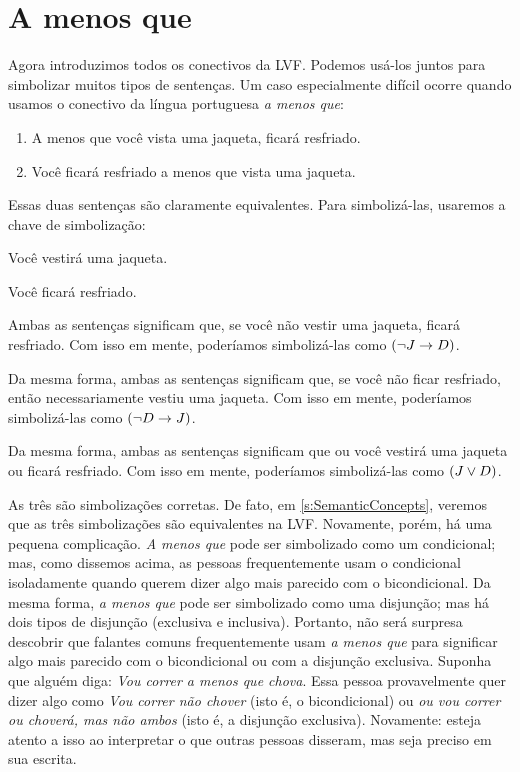 \section{A menos que}
Agora introduzimos todos os conectivos da LVF. Podemos usá-los juntos
para simbolizar muitos tipos de sentenças. Um caso especialmente difícil
ocorre quando usamos o conectivo da língua portuguesa \emph{a menos que}:

\begin{enumerate}
\item\label{unless1}A menos que você vista uma jaqueta, ficará resfriado.
\item\label{unless2}Você ficará resfriado a menos que vista uma jaqueta.
\end{enumerate}
Essas duas sentenças são claramente equivalentes. Para simbolizá-las,
usaremos a chave de simbolização:
	\begin{ekey}
		\item[J] Você vestirá uma jaqueta.
		\item[D] Você ficará resfriado.
	\end{ekey}
Ambas as sentenças significam que, se você não vestir uma jaqueta, ficará
resfriado. Com isso em mente, poderíamos simbolizá-las como
$(\neg J \rightarrow D)$.

Da mesma forma, ambas as sentenças significam que, se você não ficar
resfriado, então necessariamente vestiu uma jaqueta. Com isso em mente,
poderíamos simbolizá-las como $(\neg D \rightarrow J)$.

Da mesma forma, ambas as sentenças significam que ou você vestirá uma
jaqueta ou ficará resfriado. Com isso em mente, poderíamos simbolizá-las
como $(J \vee D)$.

As três são simbolizações corretas. De fato, em
\cref{s:SemanticConcepts}, veremos que as três simbolizações são
equivalentes na LVF.
Novamente, porém, há uma pequena complicação. \emph{A menos que} pode
ser simbolizado como um condicional; mas, como dissemos acima, as pessoas
frequentemente usam o condicional isoladamente quando querem dizer algo
mais parecido com o bicondicional. Da mesma forma, \emph{a menos que}
pode ser simbolizado como uma disjunção; mas há dois tipos de disjunção
(exclusiva e inclusiva). Portanto, não será surpresa descobrir que
falantes comuns frequentemente usam \emph{a menos que} para significar
algo mais parecido com o bicondicional ou com a disjunção exclusiva.
Suponha que alguém diga: \emph{Vou correr a menos que chova}. Essa pessoa
provavelmente quer dizer algo como \emph{Vou correr \ifeff{} não chover}
(isto é, o bicondicional) ou \emph{ou vou correr ou choverá, mas não
ambos} (isto é, a disjunção exclusiva). Novamente: esteja atento a isso
ao interpretar o que outras pessoas disseram, mas seja preciso em sua
escrita.

